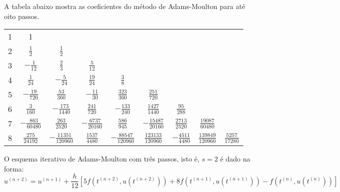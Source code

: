 A tabela abaixo mostra as coeficientes do método de Adams-Moulton para até oito passos.
 \begin{center}
\begin{tabular}{|c|cccccccc|}
\hline
1 & 1 &&&&&&&\\
2 & $\frac{1}{2}$ & $\frac{1}{2}$&&&&&&\\
3 & $-\frac{1}{12}$&$\frac{2}{3}$&$\frac{5}{12}$&&&&&\\
4 & $\frac{1}{24}$ & $-{\frac {5}{24}}$ & ${\frac {19}{24}}$ & $\frac{3}{8}$ &&&&\\
5 & $-{\frac {19}{720}}$ & ${\frac {53}{360}}$ & $-{\frac {11}{30}}$ & ${\frac {323}{360}}$ & ${\frac {251}{720}}$&&&\\
6 & ${\frac {3}{160}}$ & $-{\frac {173}{1440}}$ & ${\frac {241}{720}}$ & $-{\frac {133}{240}}$ & ${\frac {1427}{1440}}$ & ${\frac {95}{288}}$&&\\
7 & $-{\frac {863}{60480}}$ & ${\frac {263}{2520}}$ & $-{\frac {6737}{20160}}$ & ${\frac {586}{945}}$ & $-{\frac {15487}{20160}}$ & ${\frac {2713}{2520}}$ &${\frac {19087}{60480}}$&\\
8 &$ {\frac {275}{24192}}$ & $-{\frac {11351}{120960}}$&${\frac {1537}{4480}}$&$-{\frac {88547}{120960}}$&${\frac {123133}{120960}}$&$-{\frac {4511}{4480}}$&${\frac {139849}{120960}}$&${\frac {5257}{17280}}$\\
\hline
\end{tabular}
 \end{center}

\begin{ex} O esquema iterativo de Adams-Moulton com três passos, isto é, $s=2$ é dado na forma:
 \begin{equation}
  u^{(n+2)}=u^{(n+1)}+\frac{h}{12}\left[5f\left(t^{(n+2)},u(t^{(n+2)})\right)+8f\left(t^{(n+1)},u(t^{(n+1)})\right)-f\left(t^{(n)},u(t^{(n)})\right)\right]
 \end{equation}
 \end{ex}


